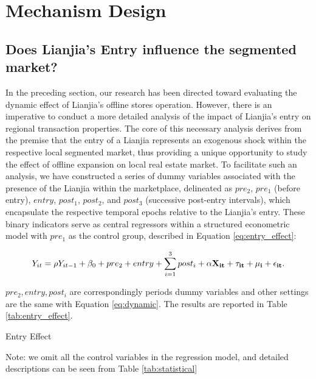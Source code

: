 \documentclass[12pt]{article}
\begin{document}

\section{Mechanism Design} \label{sec:mechanism_design}

\subsection{Does Lianjia's Entry influence the segmented market?} \label{subsec:entry_effect}

In the preceding section, our research has been directed toward evaluating the dynamic effect of Lianjia's offline stores operation. However, there is an imperative to conduct a more detailed analysis of the impact of Lianjia's entry on regional transaction properties. The core of this necessary analysis derives from the premise that the entry of a Lianjia represents an exogenous shock within the respective local segmented market, thus providing a unique opportunity to study the effect of offline expansion on local real estate market. To facilitate such an analysis, we have constructed a series of dummy variables associated with the presence of the Lianjia within the marketplace, delineated as $pre_2$, $pre_1$ (before entry), $entry$, $post_1$, $post_2$, and $post_3$ (successive post-entry intervals), which encapsulate the respective temporal epochs relative to the Lianjia's entry. These binary indicators serve as central regressors within a structured econometric model with $pre_1$ as the control group, described in Equation \eqref{eq:entry_effect}:

\begin{equation}
    Y_{it} = \rho Y_{it-1} + \beta_0 +  pre_2 + entry + \sum_{i=1}^3 post_i + \bf{\alpha} \bf{X}_{it} + \tau_{it} + \mu_i + \epsilon_{it}.   \label{eq:entry_effect}
\end{equation}

$pre_2, entry, post_i$ are correspondingly periods dummy variables and other settings are the same with Equation \eqref{eq:dynamic}. The results are reported in Table \ref{tab:entry_effect}.

\begin{table}[htb!]
  \begin{center}
    \begin{scriptsize}
    \caption{Entry Effect}
    \label{tab:entry_effect}
      
    
    Note: we omit all the control variables in the regression model, and detailed descriptions can be seen from Table \ref{tab:statistical}
    \end{scriptsize}
  \end{center}
\end{table}
\end{document}
